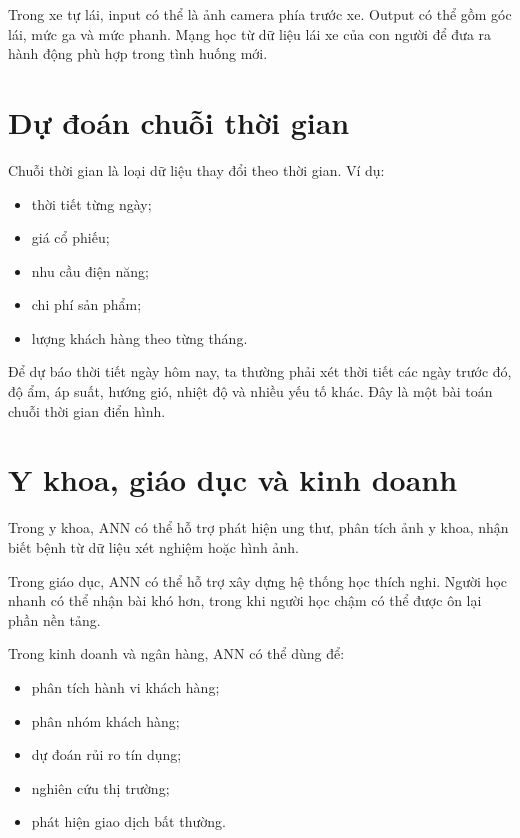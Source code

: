 \documentclass[12pt,a4paper]{report}
\begin{document}
\begin{vidu}
Trong xe tự lái, input có thể là ảnh camera phía trước xe. Output có thể gồm góc lái, mức ga và mức phanh. Mạng học từ dữ liệu lái xe của con người để đưa ra hành động phù hợp trong tình huống mới.
\end{vidu}

\section{Dự đoán chuỗi thời gian}

Chuỗi thời gian là loại dữ liệu thay đổi theo thời gian. Ví dụ:

\begin{itemize}
    \item thời tiết từng ngày;
    \item giá cổ phiếu;
    \item nhu cầu điện năng;
    \item chi phí sản phẩm;
    \item lượng khách hàng theo từng tháng.
\end{itemize}

\begin{vidu}
Để dự báo thời tiết ngày hôm nay, ta thường phải xét thời tiết các ngày trước đó, độ ẩm, áp suất, hướng gió, nhiệt độ và nhiều yếu tố khác. Đây là một bài toán chuỗi thời gian điển hình.
\end{vidu}

\section{Y khoa, giáo dục và kinh doanh}

Trong y khoa, ANN có thể hỗ trợ phát hiện ung thư, phân tích ảnh y khoa, nhận biết bệnh từ dữ liệu xét nghiệm hoặc hình ảnh.

Trong giáo dục, ANN có thể hỗ trợ xây dựng hệ thống học thích nghi. Người học nhanh có thể nhận bài khó hơn, trong khi người học chậm có thể được ôn lại phần nền tảng.

Trong kinh doanh và ngân hàng, ANN có thể dùng để:

\begin{itemize}
    \item phân tích hành vi khách hàng;
    \item phân nhóm khách hàng;
    \item dự đoán rủi ro tín dụng;
    \item nghiên cứu thị trường;
    \item phát hiện giao dịch bất thường.
\end{itemize}
\end{document}

